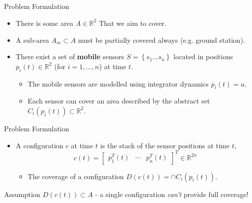 \documentclass[t]{beamer}
\newcommand{\rR}{\mathbb{R}}
\newcommand{\bmat}[1]{\begin{bmatrix}#1\end{bmatrix}}
\begin{document}
\subsection[Problem Formulation]{}
\begin{frame}[label=probformulation1]{Problem Formulation}
\begin{itemize}
\item There is some area $A \in \rR^{2}$ That we aim to cover.
\item A sub-area $A_{m} \subset A$ must be partially covered always (e.g. ground station).
\item There exist a set of \textbf{mobile} sensors $S = \left\{s_1 \ldots s_n\right\}$ located in positions $p_i(t) \in \mathbb{R}^2$ (for $i=1,\ldots,n$) at time $t$.
\begin{itemize}
\item The mobile sensors are modelled using integrator dynamics $\dot{p_i}(t) = u$.
\item Each sensor can cover an area described by the abstract set $C_i(p_i(t)) \subset \mathbb{R}^2$.
\end{itemize}
\end{itemize}
\end{frame}
\begin{frame}[label=probformulation2]{Problem Formulation}
\begin{itemize}
\item A configuration $c$ at time $t$ is the stack of the sensor positions at time $t$,
\begin{equation*}
c\left(t\right) = \bmat{
p_{1}^{T}\left(t\right)&\cdots&p_{n}^{T}\left(t\right)}^{T}\in\mathbb{R}^{2n}
\end{equation*}
\begin{itemize}
\item The coverage of a configuration $D\left( c\left( t \right) \right) = \cap C_i(p_i(t))$.
\end{itemize}
\end{itemize}
\begin{block}{Assumption}
$D\left( c\left( t \right) \right) \subset A$ - a single configuration \emph{can't} provide full coverage!
\end{block}
\end{frame}
\end{document}
